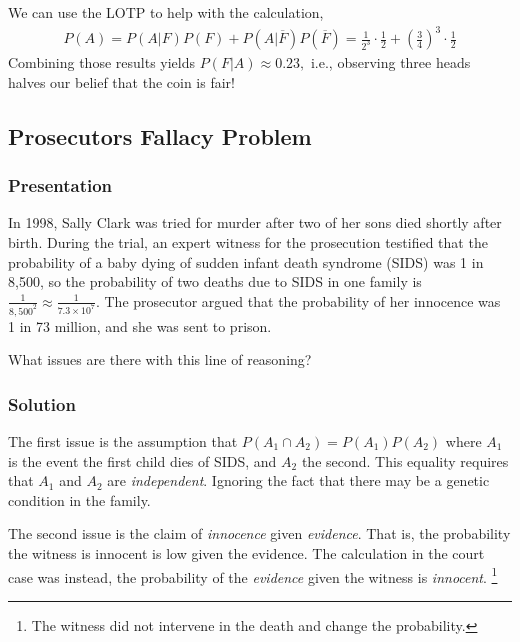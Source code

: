 We can use the LOTP to help with the calculation,
\begin{align}
P(A) = P\left( A | F \right)P(F) + P\left( A | \overline{F} \right)P\left( \overline{F} \right) = 
\frac{1}{2^{3}} \cdot \frac{1}{2} + \left( \frac{3}{4} \right)^{3} \cdot \frac{1}{2}
\end{align}
Combining those results yields
\(P\left( F | A \right) \approx 0.23,\) i.e., observing three heads
halves our belief that the coin is fair!

\subsection{Prosecutors Fallacy Problem}

\subsubsection{Presentation}

In 1998, 
Sally Clark was tried for murder after two of her sons died shortly after birth. 
During the trial, 
an expert witness for the prosecution testified that the probability of a baby dying of sudden infant 
death syndrome (SIDS) was 1 in 8,500, 
so the probability of two deaths due to SIDS in one family is \(\frac{1}{{8,500}^{2}} \approx \frac{1}{7.3\times10^7}\). 
The prosecutor argued that the probability of her innocence was 1 in 73 million, 
and she was sent to prison.

What issues are there with this line of reasoning?

\clearpage
\subsubsection{Solution}

The first issue is the assumption that 
\(P\left( A_{1} \cap A_{2} \right) = P\left( A_{1} \right)P(A_{2})\)
where \(A_{1}\) is the event the first child dies of SIDS, and \(A_{2}\) the second. 
This equality requires that \(A_{1}\) and \(A_{2}\) are \emph{independent}. 
Ignoring the fact that there may be a genetic condition in the family.

The second issue is the claim of \emph{innocence} given \emph{evidence}.
That is, 
the probability the witness is innocent is low given the evidence. 
The calculation in the court case was instead, 
the probability of the \emph{evidence} given the witness is \emph{innocent}.%
\footnote{The witness did not intervene in the death and change the probability.}

